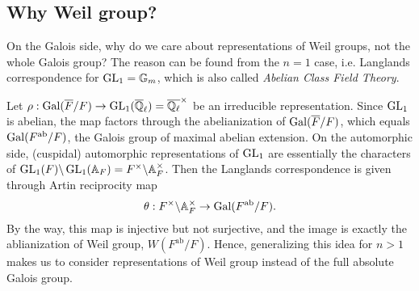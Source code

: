 \subsection{Why Weil group?}
On the Galois side, why do we care about representations of Weil groups, not the whole Galois group?
The reason can be found from the $n=1$ case, i.e. Langlands correspondence for $\operatorname{\mathrm{GL}}_1 = \mathbb{G}_m$, which is also
called \emph{Abelian Class Field Theory}.

Let $\rho : \operatorname{\mathrm{Gal}}(\overline{F}/F) \to \operatorname{\mathrm{GL}}_1(\overline{\mathbb{Q}}_\ell) = \overline{\mathbb{Q}_{\ell}}^{\times}$
be an irreducible representation.
Since $\operatorname{\mathrm{GL}}_1$ is abelian, the map factors through the abelianization of $\operatorname{\mathrm{Gal}}(\overline{F}/F)$, which equals
$\operatorname{\mathrm{Gal}}(F^{\mathrm{ab}}/F)$, the Galois group of maximal abelian extension.
On the automorphic side, (cuspidal) automorphic representations of $\operatorname{\mathrm{GL}}_1$ are essentially the characters of $\operatorname{\mathrm{GL}}_1(F) \backslash \operatorname{\mathrm{GL}}_1(\mathbb{A}_F) = F^{\times} \backslash \mathbb{A}_F^{\times}$.
Then the Langlands correspondence is given through Artin reciprocity map
$$
\theta: F^{\times} \backslash \mathbb{A}_F^{\times} \to \operatorname{\mathrm{Gal}}(F^{\mathrm{ab}} / F).
$$
By the way, this map is injective but not surjective, and the image is exactly the ablianization of Weil group, $W(F^{\mathrm{ab}}/F)$.
Hence, generalizing this idea for $n > 1$ makes us to consider representations of Weil group instead of the
full absolute Galois group.